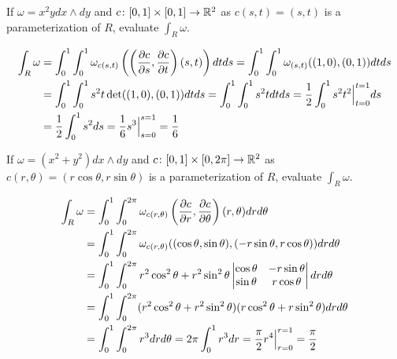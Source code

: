 \documentclass[notes.tex]{subfiles}
\begin{document}
\begin{exercise}
    If $\omega = x^2 y dx \wedge dy$ and $c\colon [0, 1] \times [0, 1] \to \mathbb{R}^2$ as $c(s, t) = (s, t)$ is a parameterization of $R$, evaluate $\int_R \omega$.
\end{exercise}
\begin{solution}
    \begin{align*}
        \int_R \omega
        &= \int_0^1 \int_0^1 \omega_{c(s, t)}\left( \left(\frac{\partial c}{\partial s}, \frac{\partial c}{\partial t}\right)(s, t) \right)dtds
        = \int_0^1 \int_0^1 \omega_{(s, t)}((1, 0), (0, 1))dtds \\
        &= \int_0^1 \int_0^1 s^2 t \operatorname{det}((1, 0), (0, 1)) dtds
        = \int_0^1 \int_0^1 s^2 t dtds
        = \frac{1}{2} \int_0^1 s^2 t^2\Big|_{t = 0}^{t = 1} ds \\
        &= \frac{1}{2} \int_0^1 s^2 ds
        = \frac{1}{6} s^3\Big|_{s = 0}^{s = 1}
        = \frac{1}{6}
    \end{align*}
\end{solution}

\begin{exercise}
    If $\omega = (x^2 + y^2)dx\wedge dy$ and $c\colon [0, 1] \times [0, 2\pi] \to \mathbb{R}^2$ as $c(r, \theta) = (r\cos \theta, r\sin \theta)$ is a parameterization of $R$, evaluate $\int_R \omega$.
\end{exercise}
\begin{solution}
    {\allowdisplaybreaks
    \begin{align*}
        \int_R \omega
        &= \int_0^1 \int_0^{2\pi} \omega_{c(r, \theta)}\left( \frac{\partial c}{\partial r}, \frac{\partial c}{\partial \theta} \right)(r, \theta) drd\theta \\
        &= \int_0^1 \int_0^{2\pi} \omega_{c(r, \theta)}( (\cos\theta, \sin\theta), (-r\sin\theta, r\cos\theta) )drd\theta \\
        &= \int_0^1 \int_0^{2\pi} r^2\cos^2\theta + r^2\sin^2\theta\begin{vmatrix}
            \cos \theta & -r\sin\theta \\
            \sin \theta & r\cos\theta
        \end{vmatrix}drd\theta \\
        &= \int_0^1 \int_0^{2\pi} (r^2\cos^2\theta + r^2\sin^2\theta)(r\cos^2\theta + r\sin^2\theta)drd\theta \\
        &= \int_0^1 \int_0^{2\pi} r^3 drd\theta
        = 2\pi\int_0^1 r^3 dr
        = \frac{\pi}{2} r^4\Big|_{r = 0}^{r = 1}
        = \frac{\pi}{2}
    \end{align*}
    }
\end{solution}
\end{document}
